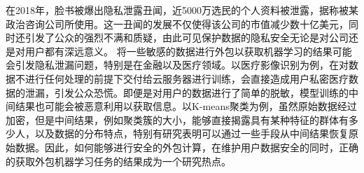 在2018年，脸书被爆出隐私泄露丑闻，近5000万选民的个人资料被泄露，据称被某政治咨询公司所使用。这一丑闻的发展不仅使得该公司的市值减少数十亿美元，同时还引发了公众的强烈不满和质疑，由此可见保护数据的隐私安全无论是对公司还是对用户都有深远意义。
将一些敏感的数据进行外包以获取机器学习的结果可能会引发隐私泄漏问题，特别是在金融以及医疗领域。以医疗影像识别为例，在对数据不进行任何处理的前提下交付给云服务器进行训练，会直接造成用户私密医疗数据的泄漏，引发公众恐慌。即便是对用户的数据进行了简单的脱敏，模型训练的中间结果也可能会被恶意利用以获取信息。以K-means聚类为例，虽然原始数据经过加密，但是中间结果，例如聚类簇的大小，能够直接揭露具有某种特征的群体有多少人，以及数据的分布特点，特别有研究表明可以通过一些手段从中间结果恢复原始数据\cite{liu2021when}。因此，如何能够进行安全的外包计算，在维护用户数据安全的同时，正确的获取外包机器学习任务的结果成为一个研究热点。

